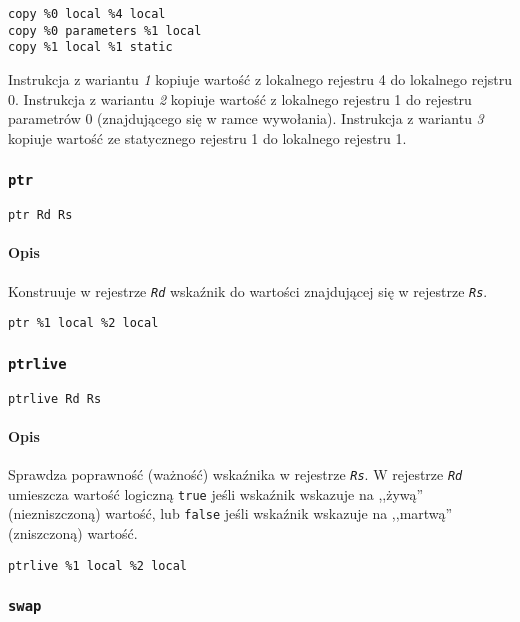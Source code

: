 \begin{lstlisting}
copy %0 local %4 local
copy %0 parameters %1 local
copy %1 local %1 static
\end{lstlisting}

Instrukcja z wariantu \emph{1} kopiuje wartość z lokalnego rejestru 4 do
lokalnego rejstru 0.
Instrukcja z wariantu \emph{2} kopiuje wartość z lokalnego rejestru 1 do
rejestru parametrów 0 (znajdującego się w ramce wywołania).
Instrukcja z wariantu \emph{3} kopiuje wartość ze statycznego rejestru 1 do
lokalnego rejestru 1.

\subsubsection{\texttt{ptr}}

\begin{lstlisting}
ptr Rd Rs
\end{lstlisting}

\paragraph*{Opis} Konstruuje w rejestrze \texttt{\emph{Rd}} wskaźnik do wartości
znajdującej się w rejestrze \texttt{\emph{Rs}}.

\begin{lstlisting}
ptr %1 local %2 local
\end{lstlisting}

\subsubsection{\texttt{ptrlive}}

\begin{lstlisting}
ptrlive Rd Rs
\end{lstlisting}

\paragraph*{Opis} Sprawdza poprawność (ważność) wskaźnika w rejestrze
\texttt{\emph{Rs}}. W rejestrze \texttt{\emph{Rd}} umieszcza wartość logiczną
\texttt{true} jeśli wskaźnik wskazuje na ,,żywą'' (niezniszczoną) wartość, lub
\texttt{false} jeśli wskaźnik wskazuje na ,,martwą'' (zniszczoną) wartość.

\begin{lstlisting}
ptrlive %1 local %2 local
\end{lstlisting}

\subsubsection{\texttt{swap}}

